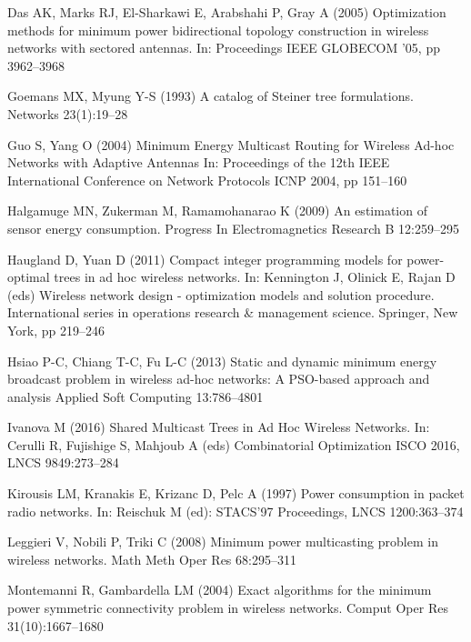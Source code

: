 \documentclass[natbib,smallextended]{svjour3}       %
\begin{document}
\begin{thebibliography}{}
Das AK, Marks RJ, El-Sharkawi E, Arabshahi P, Gray A (2005)
Optimization methods for minimum power bidirectional topology construction in wireless networks with sectored antennas.
In: Proceedings IEEE GLOBECOM ’05, pp 3962--3968

Goemans MX, Myung Y-S (1993)
A catalog of Steiner tree formulations.
Networks
23(1):19--28

Guo S, Yang O (2004)
Minimum Energy Multicast Routing for Wireless Ad-hoc Networks with Adaptive Antennas 
In: Proceedings of the 12th IEEE International Conference on Network Protocols ICNP 2004,
pp 151--160

Halgamuge MN, Zukerman M, Ramamohanarao K (2009)
An estimation of sensor energy consumption.
Progress In Electromagnetics Research B 12:259--295

Haugland D, Yuan D (2011)
Compact integer programming models for power-optimal trees in ad hoc wireless networks.
In: Kennington J, Olinick E, Rajan D (eds) Wireless network design - optimization models and solution procedure.
International series in operations research \& management science.
Springer, New York, pp 219--246

Hsiao P-C, Chiang T-C, Fu L-C (2013)
Static and dynamic minimum energy broadcast problem in wireless ad-hoc networks: A PSO-based approach and analysis
Applied Soft Computing
13:786--4801

Ivanova M (2016)
Shared Multicast Trees in Ad Hoc Wireless Networks.
In: Cerulli R, Fujishige S, Mahjoub A (eds) Combinatorial Optimization ISCO 2016,
LNCS 9849:273--284

Kirousis LM, Kranakis E, Krizanc D, Pelc A (1997)
Power consumption in packet radio networks.
In: Reischuk M (ed): STACS'97 Proceedings,
LNCS 1200:363--374

Leggieri V, Nobili P, Triki C (2008)
Minimum power multicasting problem in wireless networks.
Math Meth Oper Res 68:295--311

Montemanni R, Gambardella LM (2004)
Exact algorithms for the minimum power symmetric connectivity problem in wireless networks.
Comput Oper Res 31(10):1667--1680


\end{thebibliography}
\end{document}
